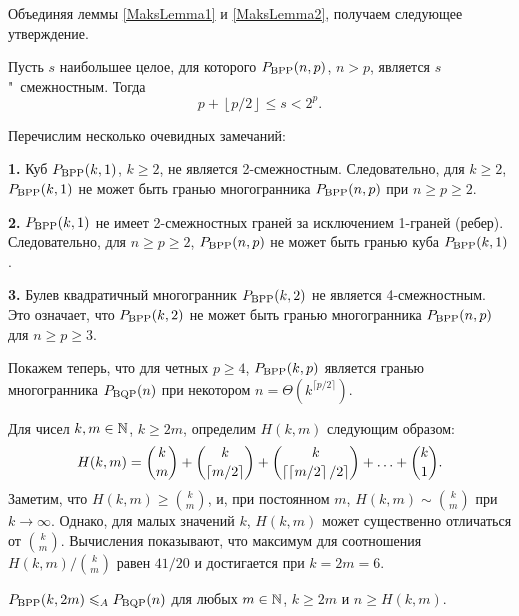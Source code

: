 Объединяя леммы \ref{MaksLemma1} и \ref{MaksLemma2}, получаем следующее утверждение.


\begin{theorem}
\label{MaksT1} 
Пусть $s$ наибольшее целое, для которого $P_{\textup{BPP}}(n,p)$, $n > p$, является $s$"~смежностным.
Тогда
\[
p + \left\lfloor p / 2 \right\rfloor \le s < 2^p.
\]
\end{theorem}


Перечислим несколько очевидных замечаний:

\textbf{1.} Куб $P_{\textup{BPP}}(k,1)$, $k \ge 2$, не является 2-смежностным.
Следовательно, для $k \ge 2$, $P_{\textup{BPP}}(k,1)$ не может быть гранью 
многогранника $P_{\textup{BPP}}(n,p)$ при $n \ge p \ge 2$.

\textbf{2.} $P_{\textup{BPP}}(k,1)$ не имеет 2-смежностных граней за исключением 1-граней (ребер).
Следовательно, для $n \ge p \ge 2$, $P_{\textup{BPP}}(n,p)$ не может быть гранью куба $P_{\textup{BPP}}(k,1)$.

\textbf{3.} Булев квадратичный многогранник $P_{\textup{BPP}}(k,2)$ не является 4-смежностным.
Это означает, что $P_{\textup{BPP}}(k,2)$ не может быть гранью многогранника $P_{\textup{BPP}}(n,p)$ для $n \ge p \ge 3$.

Покажем теперь, что для четных $p \ge 4$, $P_{\textup{BPP}}(k,p)$ является гранью многогранника $P_{\textup{BQP}}(n)$ при некотором $n = \Theta(k^{\lceil p/2\rceil})$.

Для чисел $k,m \in \mathbb{N}$, $k \ge 2m$, определим $H(k,m)$ следующим образом:
\begin{equation}
H(k,m) = \binom{k}{m} + \binom{k}{\left\lceil m / 2 \right\rceil} 
+ \binom{k}{\left\lceil \left\lceil m / 2 \right\rceil / 2 \right\rceil} 
+ \ldots + \binom{k}{1}.
\notag%
\end{equation}
Заметим, что $H(k,m) \ge \binom{k}{m}$, и, при постоянном $m$, 
$H(k,m) \sim \binom{k}{m}$ при $k \rightarrow \infty$.
Однако, для малых значений $k$, $H(k,m)$ может существенно отличаться от $\binom{k}{m}$. 
Вычисления показывают, что максимум для соотношения $H(k,m) / \binom{k}{m}$ равен $41 / 20$ и достигается при $k = 2m = 6$.


\begin{theorem}
\label{MaksT2} 
$P_{\textup{BPP}}(k, 2m) \leqslant_A P_{\textup{BQP}}(n)$ для любых $m \in \mathbb{N}$, $k \ge 2m$ и $n \ge H(k,m)$.
\end{theorem}

